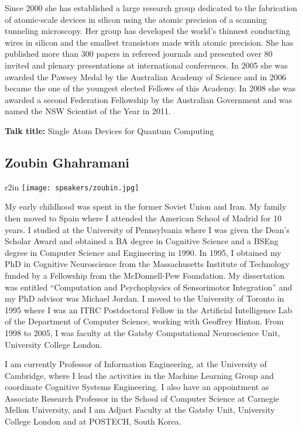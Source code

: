 Since 2000 she has established a large research group dedicated to the fabrication of atomic-scale
devices in silicon using the atomic precision of a scanning tunneling microscopy. Her group has
developed the world's thinnest conducting wires in silicon and the smallest transistors made with
atomic precision. She has published more than 300 papers in refereed journals and presented over
80 invited and plenary presentations at international conferences. In 2005 she was awarded the
Pawsey Medal by the Australian Academy of Science and in 2006 became the one of the youngest
elected Fellows of this Academy. In 2008 she was awarded a second Federation Fellowship by the
Australian Government and was named the NSW Scientist of the Year in 2011.

\bigskip
{\bf Talk title:} Single Atom Devices for Quantum Computing

\subsection*{Zoubin Ghahramani}
\begin{wrapfigure}{r}{2in}
\centering
\texttt{[image: speakers/zoubin.jpg]}
\end{wrapfigure}

My early childhood was spent in the former Soviet Union and Iran. My family then moved to Spain where I attended the American School of Madrid for 10 years. I studied at the University of Pennsylvania where I was given the Dean's Scholar Award and obtained a BA degree in Cognitive Science and a BSEng degree in Computer Science and Engineering in 1990. In 1995, I obtained my PhD in Cognitive Neuroscience from the Massachusetts Institute of Technology funded by a Fellowship from the McDonnell-Pew Foundation. My dissertation was entitled ``Computation and Psychophysics of Sensorimotor Integration'' and my PhD advisor was Michael Jordan. I moved to the University of Toronto in 1995 where I was an ITRC Postdoctoral Fellow in the Artificial Intelligence Lab of the Department of Computer Science, working with Geoffrey Hinton. From 1998 to 2005, I was faculty at the Gatsby Computational Neuroscience Unit, University College London.

I am currently Professor of Information Engineering, at the University of Cambridge, where I lead the activities in the Machine Learning Group and coordinate Cognitive Systems Engineering. I also have an appointment as Associate Research Professor in the School of Computer Science at Carnegie Mellon University, and I am Adjuct Faculty at the Gatsby Unit, University College London and at POSTECH, South Korea.

